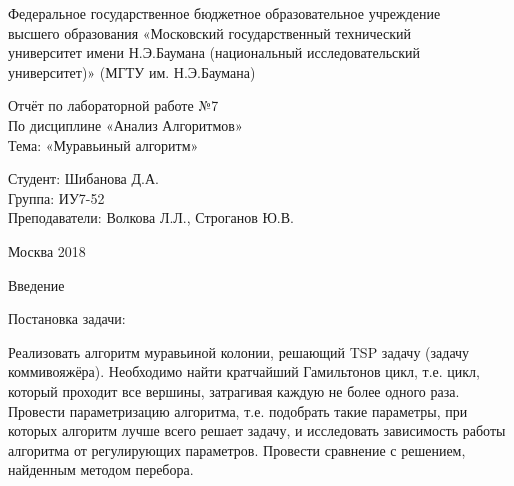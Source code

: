\documentclass[12pt,a4paper]{scrartcl}
\begin{document}
\begin{titlepage}
\newpage
\begin{center}
Федеральное государственное бюджетное образовательное учреждение  \\
\vspace{0.25cm}%
высшего образования «Московский государственный технический  \\
\vspace{0.25cm}%
университет имени Н.Э.Баумана (национальный исследовательский \\
\vspace{0.25cm}%
университет)» (МГТУ им. Н.Э.Баумана) \\
\end{center}
\vspace{5.0cm}
\begin{center}
\Large Отчёт по лабораторной работе №7 \\ По дисциплине «Анализ Алгоритмов» \\ Тема: «Муравьиный алгоритм» %
\end{center}
\vspace{6em}
\begin{flushright}
Студент: \hrulefill Шибанова Д.А. \\
\vspace{1.5em}
Группа: \hrulefill ИУ7-52\\
\vspace{1.5em}
Преподаватели: \hrulefill Волкова Л.Л., Строганов Ю.В.\\
\vspace{1.5em}
\end{flushright}
\vspace{\fill}
\begin{center}
Москва 2018
\end{center}
\end{titlepage}
\clearpage
\tableofcontents
{}
\newpage
\begin{center}
Введение
\end{center}
Постановка задачи:

Реализовать алгоритм муравьиной колонии, решающий TSP задачу (задачу коммивояжёра). Необходимо найти кратчайший Гамильтонов цикл, т.е. цикл, который проходит все вершины, затрагивая каждую не более одного раза. Провести параметризацию алгоритма, т.е. подобрать такие параметры, при которых алгоритм лучше всего решает задачу, и исследовать зависимость работы алгоритма от регулирующих параметров. Провести сравнение с решением, найденным методом перебора.
\end{document}
